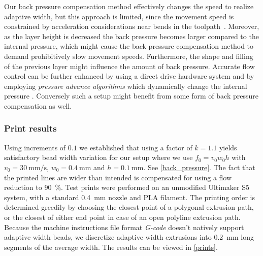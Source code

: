 \documentclass[5p,10pt,times]{elsarticle}
\theoremstyle{definition}
\numberwithin{question}{section}
\begin{document}
{{%
Our back pressure compensation method effectively changes the speed to realize adaptive width,
but this approach is limited, since the movement speed is constrained by acceleration considerations near bends in the toolpath~\cite{Ertay2018}.
Moreover, as the layer height is decreased the back pressure becomes larger compared to the internal pressure, which might cause the back pressure compensation method to demand prohibitively slow movement speeds.
Furthermore, the shape and filling of the previous layer might influence the amount of back pressure.
%
Accurate flow control can be further enhanced by using a direct drive hardware system and by employing \emph{pressure advance algorithms} which dynamically change the internal pressure \cite{tronvoll2019investigating}.
Conversely such a setup might benefit from some form of back pressure compensation as well.

\subsubsection{Print results}
Using increments of $0.1$ we established that using a factor of $k=1.1$ yields satisfactory bead width variation for our setup where we use
$f_0 = v_0 w_0 h $
with
$v_0=\SI{30}{\milli\meter\per\second}$, 
$w_0=\SI{0.4}{\milli\meter}$
and
$h=\SI{0.1}{\milli\meter}$.
See \cref{back_pressure}.
The fact that the printed lines are wider than intended is compensated for using a flow reduction to \SI{90}{\percent}.
%
Test prints were performed on an unmodified Ultimaker S5 system,
with a standard  \SI{0.4}{\milli\meter} nozzle
and PLA filament.
The printing order is determined greedily by choosing the closest point of a polygonal extrusion path, or the closest of either end point in case of an open polyline extrusion path.
Because the machine instructions file format \emph{G-code} doesn't natively support adaptive width beads,
we discretize adaptive width extrusions into \SI{0.2}{\milli\meter} long segments of the average width.
The results can be viewed in \cref{prints}.


}}
\end{document}
